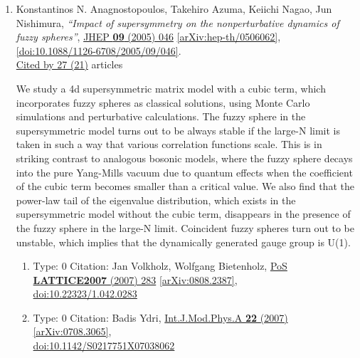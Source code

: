 \documentclass[a4paper,10pt]{article}
\begin{document}
\begin{enumerate}
\item Konstantinos N. Anagnostopoulos, Takehiro Azuma, Keiichi Nagao, Jun Nishimura, {\it ``Impact of supersymmetry on the nonperturbative dynamics of fuzzy spheres''}, \href{https://www.doi.org/10.1088/1126-6708/2005/09/046}{JHEP {\bf 09} (2005) 046} \href{https://arxiv.org/abs/hep-th/0506062}{[arXiv:hep-th/0506062]}, \href{https://www.doi.org/10.1088/1126-6708/2005/09/046}{[doi:10.1088/1126-6708/2005/09/046]}.
\\\href{https://inspirehep.net/literature/?q=refersto%3Arecid%3A684415}{Cited by 27 (21)} articles

We study a 4d supersymmetric matrix model with a cubic term, which incorporates fuzzy spheres as classical solutions, using Monte Carlo simulations and perturbative calculations. The fuzzy sphere in the supersymmetric model turns out to be always stable if the large-N limit is taken in such a way that various correlation functions scale. This is in striking contrast to analogous bosonic models, where the fuzzy sphere decays into the pure Yang-Mills vacuum due to quantum effects when the coefficient of the cubic term becomes smaller than a critical value. We also find that the power-law tail of the eigenvalue distribution, which exists in the supersymmetric model without the cubic term, disappears in the presence of the fuzzy sphere in the large-N limit. Coincident fuzzy spheres turn out to be unstable, which implies that the dynamically generated gauge group is U(1).
\begin{enumerate}
  \item Type: 0 Citation: Jan Volkholz, Wolfgang Bietenholz, \href{https://www.doi.org/10.22323/1.042.0283}{PoS {\bf LATTICE2007} (2007) 283}  \href{https://arxiv.org/abs/0808.2387}{[arXiv:0808.2387]},\\\href{https://www.doi.org/10.22323/1.042.0283}{doi:10.22323/1.042.0283}
  \item Type: 0 Citation: Badis Ydri, \href{https://www.doi.org/10.1142/S0217751X07038062}{Int.J.Mod.Phys.A {\bf 22} (2007) }  \href{https://arxiv.org/abs/0708.3065}{[arXiv:0708.3065]},\\\href{https://www.doi.org/10.1142/S0217751X07038062}{doi:10.1142/S0217751X07038062}

\end{enumerate}
\end{enumerate}
\end{document}

